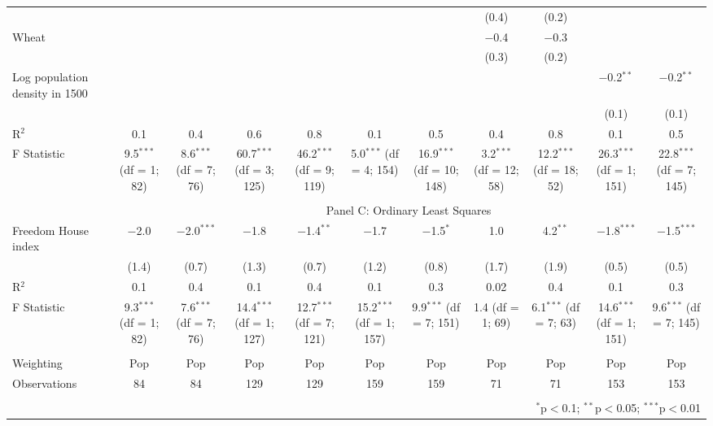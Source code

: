 {\begin{table}[]
\begin{threeparttable}
\begin{tabular}{@{\extracolsep{0pt}}lcccccccccc}
  &  &  &  &  &  &  & (0.4) & (0.2) &  &  \\ 
  Wheat &  &  &  &  &  &  & $-$0.4 & $-$0.3 &  &  \\ 
  &  &  &  &  &  &  & (0.3) & (0.2) &  &  \\ 
  Log population density in 1500 &  &  &  &  &  &  &  &  & $-$0.2$^{**}$ & $-$0.2$^{**}$ \\ 
  &  &  &  &  &  &  &  &  & (0.1) & (0.1) \\ 
  R$^{2}$ & 0.1 & 0.4 & 0.6 & 0.8 & 0.1 & 0.5 & 0.4 & 0.8 & 0.1 & 0.5 \\ 
F Statistic & 9.5$^{***}$ (df = 1; 82) & 8.6$^{***}$ (df = 7; 76) & 60.7$^{***}$ (df = 3; 125) & 46.2$^{***}$ (df = 9; 119) & 5.0$^{***}$ (df = 4; 154) & 16.9$^{***}$ (df = 10; 148) & 3.2$^{***}$ (df = 12; 58) & 12.2$^{***}$ (df = 18; 52) & 26.3$^{***}$ (df = 1; 151) & 22.8$^{***}$ (df = 7; 145) \\ 
 \hline \\[-1.8ex] 
   & \multicolumn{10}{c}{Panel C: Ordinary Least Squares} \\
Freedom House index & $-$2.0 & $-$2.0$^{***}$ & $-$1.8 & $-$1.4$^{**}$ & $-$1.7 & $-$1.5$^{*}$ & 1.0 & 4.2$^{**}$ & $-$1.8$^{***}$ & $-$1.5$^{***}$ \\ 
  & (1.4) & (0.7) & (1.3) & (0.7) & (1.2) & (0.8) & (1.7) & (1.9) & (0.5) & (0.5) \\ 
R$^{2}$ & 0.1 & 0.4 & 0.1 & 0.4 & 0.1 & 0.3 & 0.02 & 0.4 & 0.1 & 0.3 \\ 
F Statistic & 9.3$^{***}$ (df = 1; 82) & 7.6$^{***}$ (df = 7; 76) & 14.4$^{***}$ (df = 1; 127) & 12.7$^{***}$ (df = 7; 121) & 15.2$^{***}$ (df = 1; 157) & 9.9$^{***}$ (df = 7; 151) & 1.4 (df = 1; 69) & 6.1$^{***}$ (df = 7; 63) & 14.6$^{***}$ (df = 1; 151) & 9.6$^{***}$ (df = 7; 145) \\ 
  \hline \\[-1.8ex] 
Weighting & Pop & Pop & Pop & Pop & Pop & Pop & Pop & Pop & Pop & Pop \\ 
Observations & 84 & 84 & 129 & 129 & 159 & 159 & 71 & 71 & 153 & 153 \\ 
\hline 
\hline \\[-1.8ex] 
  & \multicolumn{10}{r}{$^{*}$p$<$0.1; $^{**}$p$<$0.05; $^{***}$p$<$0.01} \\ 
\end{tabular} 
\begin{tablenotes} 

\end{tablenotes}
\end{threeparttable}
\end{table}}
